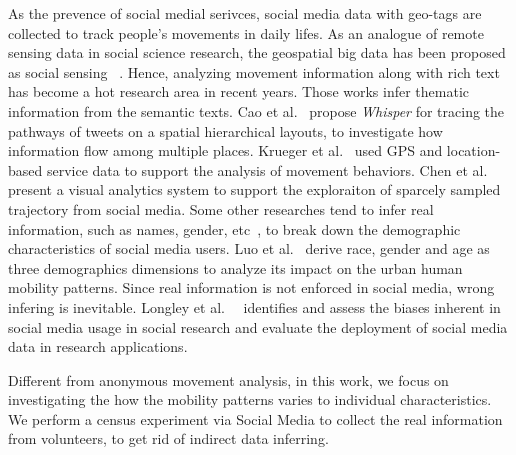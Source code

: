 As the prevence of social medial serivces, social media data with geo-tags are collected to track people's movements in daily lifes. As an analogue of remote sensing data in social science research, the geospatial big data has been proposed as social sensing ~\cite{liu2015social}. Hence, analyzing movement information along with rich text has become a hot research area in recent years. Those works infer thematic information from the semantic texts. Cao et al.~\cite{cao2012whisper} propose \textit{Whisper} for tracing the pathways of tweets on a spatial hierarchical layouts, to investigate how information flow among multiple places. Krueger et al.~\cite{krueger2014visual} used GPS and location-based service data to support the analysis of movement behaviors. Chen et al.~\cite{chen2016interactive} present a visual analytics system to support the exploraiton of sparcely sampled trajectory from social media. Some other researches tend to infer real information, such as names, gender, etc~\cite{peddinti2014internet}, to break down the demographic characteristics of social media users. Luo et al.~\cite{luo2016explore} derive race, gender and age as three demographics dimensions to analyze its impact on the urban human mobility patterns. Since real information is not enforced in social media, wrong infering is inevitable. Longley et al.~\cite{Longley2015}~\cite{Paul2016_twitter} identifies and assess the biases inherent in social media usage in social research and evaluate the deployment of social media data in research applications.  

Different from anonymous movement analysis, in this work, we focus on investigating the how the mobility patterns varies to individual characteristics. We perform a census experiment via Social Media to collect the real information from volunteers, to get rid of indirect data inferring.






